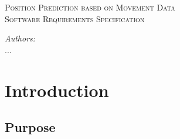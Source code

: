 \documentclass[12pt]{article} %
\begin{document}


\begin{titlepage}

\newcommand{\HRule}{\rule{\linewidth}{0.5mm}} %

\center %

\textsc{\Large Position Prediction based on Movement Data}\\[0.5cm] %
\textsc{\large Software Requirements Specification}\\[0.5cm] %

\vfill

\emph{Authors:}\\
...

\vfill %

\end{titlepage}


\tableofcontents %

\newpage %


\section{Introduction} %


\subsection{Purpose}

\end{document}

